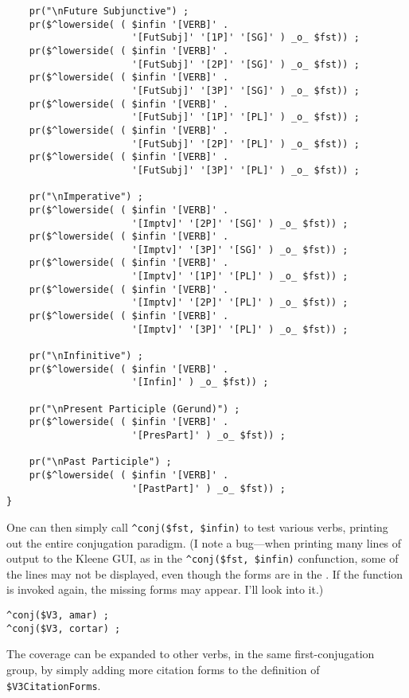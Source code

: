 \begin{Verbatim}
    pr("\nFuture Subjunctive") ;
    pr($^lowerside( ( $infin '[VERB]' . 
                      '[FutSubj]' '[1P]' '[SG]' ) _o_ $fst)) ;
    pr($^lowerside( ( $infin '[VERB]' . 
                      '[FutSubj]' '[2P]' '[SG]' ) _o_ $fst)) ;
    pr($^lowerside( ( $infin '[VERB]' . 
                      '[FutSubj]' '[3P]' '[SG]' ) _o_ $fst)) ;
    pr($^lowerside( ( $infin '[VERB]' . 
                      '[FutSubj]' '[1P]' '[PL]' ) _o_ $fst)) ;
    pr($^lowerside( ( $infin '[VERB]' . 
                      '[FutSubj]' '[2P]' '[PL]' ) _o_ $fst)) ;
    pr($^lowerside( ( $infin '[VERB]' . 
                      '[FutSubj]' '[3P]' '[PL]' ) _o_ $fst)) ;

    pr("\nImperative") ;
    pr($^lowerside( ( $infin '[VERB]' . 
                      '[Imptv]' '[2P]' '[SG]' ) _o_ $fst)) ;
    pr($^lowerside( ( $infin '[VERB]' . 
                      '[Imptv]' '[3P]' '[SG]' ) _o_ $fst)) ;
    pr($^lowerside( ( $infin '[VERB]' . 
                      '[Imptv]' '[1P]' '[PL]' ) _o_ $fst)) ;
    pr($^lowerside( ( $infin '[VERB]' . 
                      '[Imptv]' '[2P]' '[PL]' ) _o_ $fst)) ;
    pr($^lowerside( ( $infin '[VERB]' . 
                      '[Imptv]' '[3P]' '[PL]' ) _o_ $fst)) ;

    pr("\nInfinitive") ;
    pr($^lowerside( ( $infin '[VERB]' . 
                      '[Infin]' ) _o_ $fst)) ;

    pr("\nPresent Participle (Gerund)") ;
    pr($^lowerside( ( $infin '[VERB]' . 
                      '[PresPart]' ) _o_ $fst)) ;

    pr("\nPast Participle") ;
    pr($^lowerside( ( $infin '[VERB]' . 
                      '[PastPart]' ) _o_ $fst)) ;
}
\end{Verbatim}

\noindent
One can then simply call \verb!^conj($fst, $infin)! to test various verbs,
printing out the entire conjugation paradigm.  (I note a bug---when printing
many lines of output to the Kleene GUI, as in the  \verb!^conj($fst, $infin)!
confunction, some of the lines may not be displayed, even though the
forms are in the \fsm.  If the function is invoked again, the missing
forms may appear.  I'll look into it.)


\begin{Verbatim}
^conj($V3, amar) ;
^conj($V3, cortar) ;
\end{Verbatim}

\noindent
The coverage can be expanded to other verbs, in the same first-conjugation group,
by simply adding more citation forms to the definition of \verb!$V3CitationForms!.

